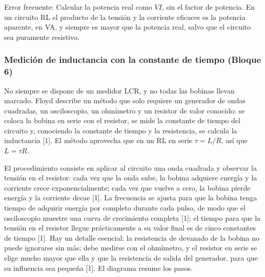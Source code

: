 \documentclass[11pt,letterpaper]{article}
\begin{document}
\begin{nota}{Error frecuente:}
Calcular la potencia real como $VI$, sin el factor de potencia. En un circuito RL el producto de la tensión y la corriente eficaces es la potencia aparente, en VA, y siempre es mayor que la potencia real, salvo que el circuito sea puramente resistivo.
\end{nota}

\subsubsection{Medición de inductancia con la constante de tiempo (Bloque 6)}

No siempre se dispone de un medidor LCR, y no todas las bobinas llevan marcado. Floyd describe un método que solo requiere un generador de ondas cuadradas, un osciloscopio, un ohmímetro y un resistor de valor conocido: se coloca la bobina en serie con el resistor, se mide la constante de tiempo del circuito y, conociendo la constante de tiempo y la resistencia, se calcula la inductancia [1]. El método aprovecha que en un RL en serie $\tau = L/R$, así que $L = \tau R$.

El procedimiento consiste en aplicar al circuito una onda cuadrada y observar la tensión en el resistor: cada vez que la onda sube, la bobina adquiere energía y la corriente crece exponencialmente; cada vez que vuelve a cero, la bobina pierde energía y la corriente decae [1]. La frecuencia se ajusta para que la bobina tenga tiempo de adquirir energía por completo durante cada pulso, de modo que el osciloscopio muestre una curva de crecimiento completa [1]; el tiempo para que la tensión en el resistor llegue prácticamente a su valor final es de cinco constantes de tiempo [1]. Hay un detalle esencial: la resistencia de devanado de la bobina no puede ignorarse sin más; debe medirse con el ohmímetro, y el resistor en serie se elige mucho mayor que ella y que la resistencia de salida del generador, para que su influencia sea pequeña [1]. El diagrama resume los pasos.
\end{document}
